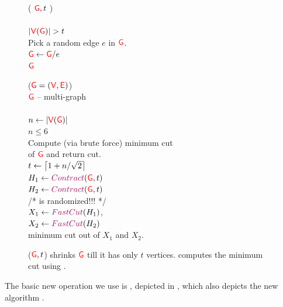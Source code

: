 \begin{figure}
    \hfill
    \begin{algorithmEnv}
        \!\!\Contract( ${\textcolor{red}{\mathsf{G}}}, t$ )\\
        \Procbegin{}  \+  \\
        \While{} $\cardin{\Vertices(\Graph)}>t$ \Do\+\\%
        Pick a random edge $e$ in ${\textcolor{red}{\mathsf{G}}}$.\\
        ${\textcolor{red}{\mathsf{G}}}\leftarrow {\textcolor{red}{\mathsf{G}}}/e$\-\\
        \Return{} ${\textcolor{red}{\mathsf{G}}}$\- \\
        \End{}
    \end{algorithmEnv}
    \hfill
    \begin{algorithmEnv}
        \noindent%
        \!\!\FastCut{}(${\textcolor{red}{\mathsf{G}}}=({\textcolor{red}{\mathsf{V}}},{\textcolor{red}{\mathsf{E}}})$) \+\\
        ${\textcolor{red}{\mathsf{G}}}$ -- multi-graph \- \\
        \Procbegin{}\+\\
        $n\leftarrow\left| {{\textcolor{red}{\mathsf{V}}}({\textcolor{red}{\mathsf{G}}})} \right|$\\
        \If{} $n\leq 6$ \Then\+ \\
        Compute (via brute force) minimum cut\\
        of ${\textcolor{red}{\mathsf{G}}}$ and return
        cut.\-\\
        $t\leftarrow \left\lceil { 1+ n/\sqrt{2}} \right\rceil$\\
        $H_{1} \leftarrow \Contract{}(\Graph,t)$\\
        $H_{2} \leftarrow \Contract{}(\Graph,t)$\\
        /* \Contract{} is randomized!!! {*}/\\
        $X_{1}\leftarrow \FastCut{}\pth{H_{1}}$,\\
        $X_{2}\leftarrow \FastCut{}\pth{H_{2}}$\\
        \Return minimum cut out of $X_{1}$ and
        $X_{2}$.\- \\
        \End{}
    \end{algorithmEnv}
    \hfill
    
    \caption{\Contract{}($ {\textcolor{red}{\mathsf{G}}}, t$) shrinks ${\textcolor{red}{\mathsf{G}}}$ till it has only
       $t$ vertices. \FastCut{} computes the minimum cut using
       \Contract{}.}
\end{figure}

The basic new operation we use is \Contract{}, depicted in
, which also depicts the new algorithm \FastCut{}.

